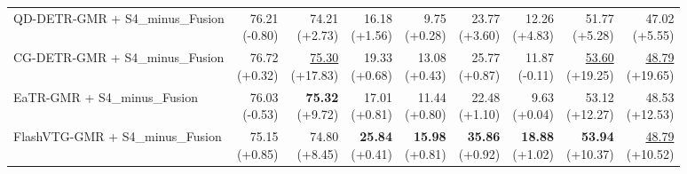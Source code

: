 \documentclass{article}
\begin{document}
\begin{table}[ht]
{\begin{tabular}{lrrrrrrrr}
QD-DETR-GMR + S4\_minus\_Fusion & \shortstack{76.21 \\ {\scriptsize (-0.80)}} & \shortstack{74.21 \\ {\scriptsize (+2.73)}} & \shortstack{16.18 \\ {\scriptsize (+1.56)}} & \shortstack{9.75 \\ {\scriptsize (+0.28)}} & \shortstack{23.77 \\ {\scriptsize (+3.60)}} & \shortstack{12.26 \\ {\scriptsize (+4.83)}} & \shortstack{51.77 \\ {\scriptsize (+5.28)}} & \shortstack{47.02 \\ {\scriptsize (+5.55)}} \\
CG-DETR-GMR + S4\_minus\_Fusion & \shortstack{76.72 \\ {\scriptsize (+0.32)}} & \shortstack{\underline{75.30} \\ {\scriptsize (+17.83)}} & \shortstack{19.33 \\ {\scriptsize (+0.68)}} & \shortstack{13.08 \\ {\scriptsize (+0.43)}} & \shortstack{25.77 \\ {\scriptsize (+0.87)}} & \shortstack{11.87 \\ {\scriptsize (-0.11)}} & \shortstack{\underline{53.60} \\ {\scriptsize (+19.25)}} & \shortstack{\underline{48.79} \\ {\scriptsize (+19.65)}} \\
EaTR-GMR + S4\_minus\_Fusion & \shortstack{76.03 \\ {\scriptsize (-0.53)}} & \shortstack{\textbf{75.32} \\ {\scriptsize (+9.72)}} & \shortstack{17.01 \\ {\scriptsize (+0.81)}} & \shortstack{11.44 \\ {\scriptsize (+0.80)}} & \shortstack{22.48 \\ {\scriptsize (+1.10)}} & \shortstack{9.63 \\ {\scriptsize (+0.04)}} & \shortstack{53.12 \\ {\scriptsize (+12.27)}} & \shortstack{48.53 \\ {\scriptsize (+12.53)}} \\
FlashVTG-GMR + S4\_minus\_Fusion & \shortstack{75.15 \\ {\scriptsize (+0.85)}} & \shortstack{74.80 \\ {\scriptsize (+8.45)}} & \shortstack{\textbf{25.84} \\ {\scriptsize (+0.41)}} & \shortstack{\textbf{15.98} \\ {\scriptsize (+0.81)}} & \shortstack{\textbf{35.86} \\ {\scriptsize (+0.92)}} & \shortstack{\textbf{18.88} \\ {\scriptsize (+1.02)}} & \shortstack{\textbf{53.94} \\ {\scriptsize (+10.37)}} & \shortstack{\underline{48.79} \\ {\scriptsize (+10.52)}} \\

\end{tabular}}
\end{table}
\end{document}
